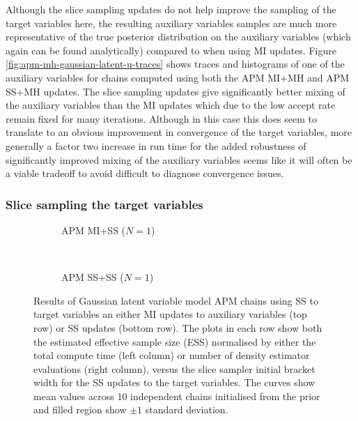 Although the slice sampling updates do not help improve the sampling of the target variables here, the resulting auxiliary variables samples are much more representative of the true posterior distribution on the auxiliary variables (which again can be found analytically) compared to when using \ac{MI} updates. Figure \ref{fig:apm-mh-gaussian-latent-u-traces} shows traces and histograms of one of the auxiliary variables for chains computed using both the \ac{APM} \ac{MI}+\ac{MH} and \ac{APM} \ac{SS}+\ac{MH} updates. The slice sampling updates give significantly better mixing of the auxiliary variables than the \ac{MI} updates which due to the low accept rate remain fixed for many iterations. Although in this case this does seem to translate to an obvious improvement in convergence of the target variables, more generally a factor two increase in run time for the added robustness of significantly improved mixing of the auxiliary variables seems like it will often be a viable tradeoff to avoid difficult to diagnose convergence issues.

\subsubsection{Slice sampling the target variables}

\begin{figure}[t]
\centering
\begin{subfigure}[b]{\linewidth}
\centering
  \caption{\ac{APM} \ac{MI}+\ac{SS} ($N=1$)}
  \label{sfig:apm-mi-ss-1-gaussian-latent}
\end{subfigure}
\\[3mm]
\begin{subfigure}[b]{\linewidth}
\centering
  \caption{\ac{APM} \ac{SS}+\ac{SS} ($N=1$)}
  \label{sfig:apm-ss-ss-1-gaussian-latent}
\end{subfigure}
\caption[\acs{APM} \acs{SS} Gaussian model results.]{
Results of Gaussian latent variable model \acs{APM} chains using \ac{SS} to target variables an either \ac{MI} updates to auxiliary variables (top row) or \ac{SS} updates (bottom row). The plots in each row show both the estimated effective sample size (ESS) normalised by either the total compute time (left column) or number of density estimator evaluations (right column), versus the slice sampler initial bracket width for the \ac{SS} updates to the target variables. The curves show mean values across 10 independent chains initialised from the prior and filled region show $\pm 1$ standard deviation.}
\label{fig:apm-ss-gaussian-latent-results}
\end{figure}

